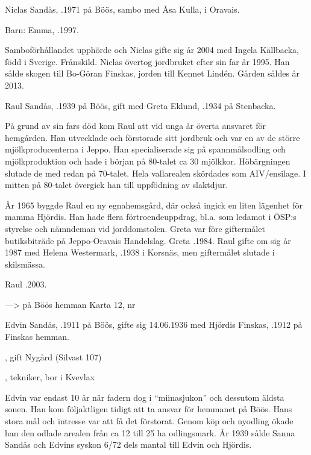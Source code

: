 Niclas Sandås,  .1971 på Böös, sambo med Åsa Kulla,  i Oravais.

Barn: Emma, .1997.

Samboförhållandet upphörde och Niclas gifte sig år 2004 med Ingela Källbacka, född i Sverige. Frånskild. Niclas övertog jordbruket efter sin far år 1995. Han sålde  skogen till Bo-Göran Finskas, jorden till Kennet Lindén. Gården såldes år 2013.


Raul Sandås, .1939 på Böös, gift med Greta Eklund, .1934 på Stenbacka.
\begin{jhchildren}
  \item {}
  \item {}
\end{jhchildren}
På grund av sin fars död kom Raul att vid unga år överta ansvaret för hemgården. Han utvecklade och förstorade sitt jordbruk och var en av de större mjölkproducenterna i Jeppo. Han specialiserade sig på spannmålsodling och mjölkproduktion och hade i början på 80-talet ca 30 mjölkkor. Höbärgningen slutade de med redan på 70-talet. Hela vallarealen skördades som AIV/ensilage. I mitten på 80-talet övergick han till uppfödning av slaktdjur.

År 1965 byggde Raul en ny egnahemsgård, där också ingick en liten lägenhet för mamma Hjördis. Han hade flera förtroendeuppdrag, bl.a. som ledamot i ÖSP:s styrelse och nämndeman vid jorddomstolen. Greta var före giftermålet butiksbiträde på Jeppo-Oravais Handelslag. Greta .1984. Raul gifte om sig år 1987 med Helena Westermark, .1938 i Korsnäs, men giftermålet slutade i skilsmässa.

Raul .2003.


--->  på Böös hemman  		Karta 12,  nr 


Edvin Sandås, .1911 på Böös, gifte sig 14.06.1936 med Hjördis	Finskas, .1912 på Finskas hemman.
\begin{jhchildren}
  \item {}, gift Nygård (Silvast  107)
  \item {}
  \item {}, tekniker, bor i Kvevlax
\end{jhchildren}
Edvin var endast 10 år när fadern dog i ``miinasjukon'' och dessutom äldsta sonen. Han kom följaktligen tidigt att ta ansvar för hemmanet på Böös. Hans stora mål och intresse var att få det förstorat. Genom köp och nyodling ökade han den odlade arealen från ca 12 till 25 ha odlingsmark. År 1939 sålde Sanna Sandås och Edvins syskon 6/72 dels mantal till Edvin och Hjördis.

